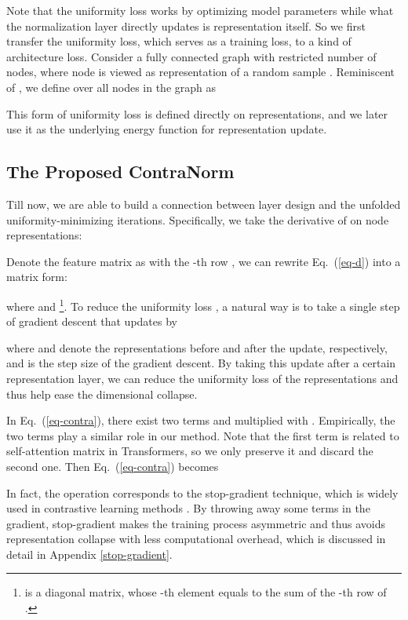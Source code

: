 \documentclass{article}
\theoremstyle{definition}
\theoremstyle{remark}
\theoremstyle{theorem}
\begin{document}
Note that the uniformity loss works by optimizing model parameters while what the normalization layer directly updates is representation itself. So we first transfer the uniformity loss, which serves as a training loss, to a kind of architecture loss. Consider a fully connected graph with restricted number of nodes, where node  is viewed as representation of a random sample . Reminiscent of , we define  over all nodes in the graph as

This form of uniformity loss is defined directly on representations, and we later use it as the underlying energy function for representation update.  

\subsection{The Proposed ContraNorm} \label{section:contranorm}
Till now, we are able to build a connection between layer design and the unfolded uniformity-minimizing iterations. Specifically, we take the derivative of  on node representations:

Denote the feature matrix as  with the -th row , we can rewrite Eq.~(\ref{eq-d}) into a matrix form:

where  and \footnote{ is a diagonal matrix, whose -th element equals to the sum of the -th row of .}. To reduce the uniformity loss , a natural way is to take a single step of gradient descent that updates  by

where  and  denote the representations before and after the update, respectively, and  is the step size of the gradient descent. By taking this update after a certain representation layer, we can reduce the uniformity loss of the representations and thus help ease the dimensional collapse.

In Eq.~(\ref{eq-contra}), there exist two terms  and  multiplied with . Empirically, the two terms play a similar role in our method. Note that the first term is related to self-attention matrix in Transformers, so we only preserve it and discard the second one. Then Eq.~(\ref{eq-contra}) becomes 

In fact, the operation corresponds to the stop-gradient technique, which is widely used in contrastive learning methods \citep{He_2020_CVPR, grill2020bootstrap,tao2022exploring}. By throwing away some terms in the gradient, stop-gradient makes the training process asymmetric and thus avoids representation collapse with less computational overhead, which is discussed in detail in Appendix \ref{stop-gradient}.
\end{document}
